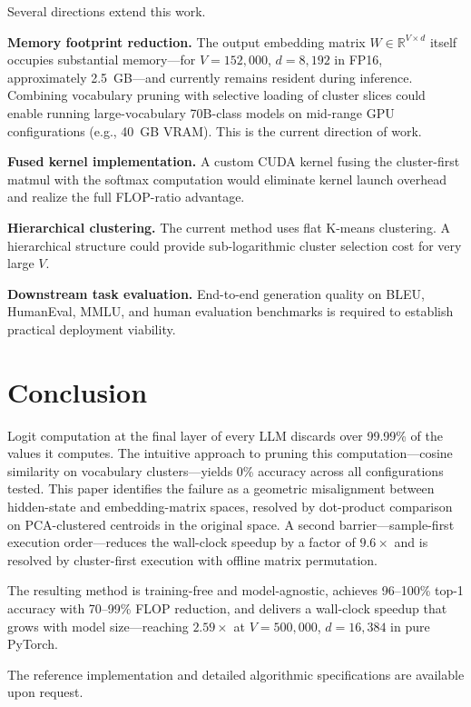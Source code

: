 \documentclass[11pt]{article}
\begin{document}
Several directions extend this work.

\textbf{Memory footprint reduction.} The output embedding matrix $W \in \mathbb{R}^{V \times d}$ itself occupies substantial memory---for $V = 152{,}000$, $d = 8{,}192$ in FP16, approximately 2.5~GB---and currently remains resident during inference. Combining vocabulary pruning with selective loading of cluster slices could enable running large-vocabulary 70B-class models on mid-range GPU configurations (e.g., 40~GB VRAM). This is the current direction of work.

\textbf{Fused kernel implementation.} A custom CUDA kernel fusing the cluster-first matmul with the softmax computation would eliminate kernel launch overhead and realize the full FLOP-ratio advantage.

\textbf{Hierarchical clustering.} The current method uses flat K-means clustering. A hierarchical structure could provide sub-logarithmic cluster selection cost for very large $V$.

\textbf{Downstream task evaluation.} End-to-end generation quality on BLEU, HumanEval, MMLU, and human evaluation benchmarks is required to establish practical deployment viability.

\section{Conclusion}

Logit computation at the final layer of every LLM discards over 99.99\% of the values it computes. The intuitive approach to pruning this computation---cosine similarity on vocabulary clusters---yields 0\% accuracy across all configurations tested. This paper identifies the failure as a geometric misalignment between hidden-state and embedding-matrix spaces, resolved by dot-product comparison on PCA-clustered centroids in the original space. A second barrier---sample-first execution order---reduces the wall-clock speedup by a factor of $9.6\times$ and is resolved by cluster-first execution with offline matrix permutation.

The resulting method is training-free and model-agnostic, achieves 96--100\% top-1 accuracy with 70--99\% FLOP reduction, and delivers a wall-clock speedup that grows with model size---reaching $2.59\times$ at $V = 500{,}000$, $d = 16{,}384$ in pure PyTorch.

The reference implementation and detailed algorithmic specifications are available upon request.
\end{document}
